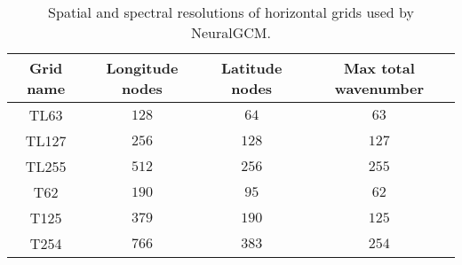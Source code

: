 \documentclass[sn-nature,Numbered]{sn-jnl}%
\begin{document}
\begin{appendices}
\begin{table}[ht]
\begin{tabular}{|c|c|c|c|}
\hline
\textbf{Grid name} & \textbf{Longitude nodes} & \textbf{Latitude nodes} & \textbf{Max total wavenumber} \\ \hline
TL63               & $128$                      & $64$                      & $63$                            \\ \hline
TL127              & $256$                      & $128$                     & $127$                           \\ \hline
TL255              & $512$                      & $256$                     & $255$                           \\ \hline
T62                & $190$                      & $95$                      & $62$                            \\ \hline
T125               & $379$                      & $190$                     & $125$                           \\ \hline
T254               & $766$                      & $383$                     & $254$                           \\ \hline
\end{tabular} \label{apx:table:gaussian_grids}
\caption{Spatial and spectral resolutions of horizontal grids used by NeuralGCM.}
\end{table}


\end{appendices}
\end{document}
